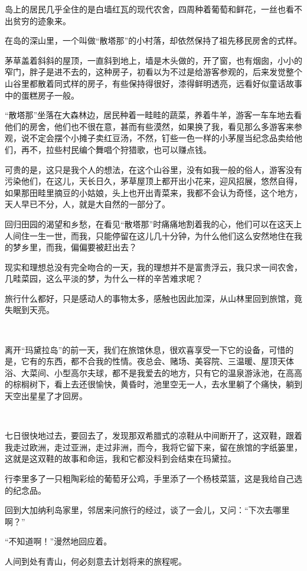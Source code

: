 \par 岛上的居民几乎全住的是白墙红瓦的现代农舍，四周种着葡萄和鲜花，一丝也看不出贫穷的迹象来。
\par 在岛的深山里，一个叫做“散塔那”的小村落，却依然保持了祖先移民房舍的式样。
\par 茅草盖着斜斜的屋顶，一直斜到地上，墙是木头做的，开了窗，也有烟囱，小小的窄门，胖子是进不去的，这种房子，初看以为不过是给游客参观的，后来发觉整个山谷里都散着同式样的房子，有些保持得很好，漆得鲜明透亮，远看好似童话故事中的蛋糕房子一般。
\par “散塔那”坐落在大森林边，居民种着一畦畦的蔬菜，养着牛羊，游客一车车地去看他们的房舍，他们也不很在意，甚而有些漠然，如果换了我，看见那么多游客来参观，说不定会摆个小摊子卖红豆汤，不然，钉些一色一样的小茅屋当纪念品卖给他们，再不，拉些村民编个舞唱个狩猎歌，也可以赚点钱。
\par 可贵的是，这只是我个人的想法，在这个山谷里，没有如我一般的俗人，游客没有污染他们，在这儿，天长日久，茅草屋顶上都开出小花来，迎风招展，悠然自得，如果那田畦里摘豆的小姑娘，头上也开出青菜来，我都不会认为奇怪，这个地方，天人早已不分，人，就是大自然的一部分了。
\par 回归田园的渴望和乡愁，在看见“散塔那”时痛痛地割着我的心，他们可以在这天上人间住一生一世，而我，只能停留在这儿几十分钟，为什么他们这么安然地住在我的梦乡里，而我，偏偏要被赶出去？
\par 现实和理想总没有完全吻合的一天，我的理想并不是富贵浮云，我只求一间农舍，几畦菜园，这么平淡的梦，为什么一样的辛苦难求呢？
\par 旅行什么都好，只是感动人的事物太多，感触也因此加深，从山林里回到旅馆，竟失眠到天亮。
\par  
\par 离开“玛黛拉岛”的前一天，我们在旅馆休息，很欢喜享受一下它的设备，可惜的是，它有的东西，都不合我的性情。夜总会、赌场、美容院、三温暖、屋顶天体浴、大菜间、小型高尔夫球，都不是我爱去的地方，只有它的温泉游泳池，在高高的棕榈树下，看上去还很愉快，黄昏时，池里空无一人，去水里躺了个痛快，躺到天空出星星了才回房。
\par  
\par 七日很快地过去，要回去了，发现那双希腊式的凉鞋从中间断开了，这双鞋，跟着我走过欧洲，走过亚洲，走过非洲，而今，我将它留下来，留在旅馆的字纸篓里，这就是这双鞋的故事和命运，我和它都没料到会结束在玛黛拉。
\par 行李里多了一只粗陶彩绘的葡萄牙公鸡，手里添了一个杨枝菜篮，这是我给自己选的纪念品。
\par 回到大加纳利岛家里，邻居来问旅行的经过，谈了一会儿，又问：“下次去哪里啊？”
\par “不知道啊！”漫然地回应着。
\par 人间到处有青山，何必刻意去计划将来的旅程呢。


